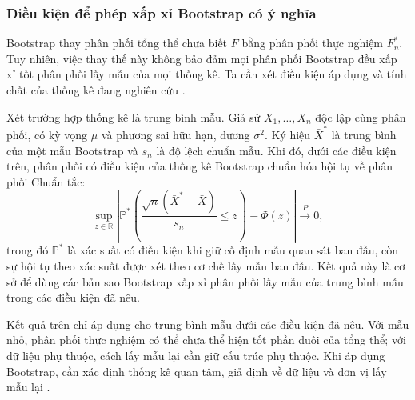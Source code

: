 \subsubsection{Điều kiện để phép xấp xỉ Bootstrap có ý nghĩa}

Bootstrap thay phân phối tổng thể chưa biết $F$ bằng phân phối thực
nghiệm $F_n^*$. Tuy nhiên, việc thay thế này không bảo đảm mọi phân phối
Bootstrap đều xấp xỉ tốt phân phối lấy mẫu của mọi thống kê. Ta cần xét
điều kiện áp dụng và tính chất của thống kê đang nghiên cứu
\cite{bickelfreedman1981}.

Xét trường hợp thống kê là trung bình mẫu. Giả sử
$X_1,\ldots,X_n$ độc lập cùng phân phối, có kỳ vọng $\mu$ và phương sai
hữu hạn, dương $\sigma^2$. Ký hiệu $\bar{X}^*$ là trung bình của một mẫu
Bootstrap và $s_n$ là độ lệch chuẩn mẫu. Khi đó, dưới các điều kiện trên,
phân phối có điều kiện của thống kê Bootstrap chuẩn hóa hội tụ về phân
phối Chuẩn tắc:
\begin{equation}
	\sup_{z\in\mathbb{R}}
	\left|
	\mathbb{P}^*\left(
	\frac{\sqrt{n}(\bar{X}^*-\bar{X})}{s_n}\leq z
	\right)
	-\Phi(z)
	\right|
	\xrightarrow{P} 0,
\end{equation}
trong đó $\mathbb{P}^*$ là xác suất có điều kiện khi giữ cố định mẫu quan
sát ban đầu, còn sự hội tụ theo xác suất được xét theo cơ chế lấy mẫu ban
đầu. Kết quả này là cơ sở để dùng các bản sao Bootstrap xấp xỉ phân phối
lấy mẫu của trung bình mẫu trong các điều kiện đã nêu.

Kết quả trên chỉ áp dụng cho trung bình mẫu dưới các điều kiện đã nêu.
Với mẫu nhỏ, phân phối thực nghiệm có thể chưa thể hiện tốt phần đuôi của
tổng thể; với dữ liệu phụ thuộc, cách lấy mẫu lại cần giữ cấu trúc phụ
thuộc. Khi áp dụng Bootstrap, cần xác định thống kê quan tâm, giả định về
dữ liệu và đơn vị lấy mẫu lại
\cite{bickelfreedman1981, davison1997}.
	
